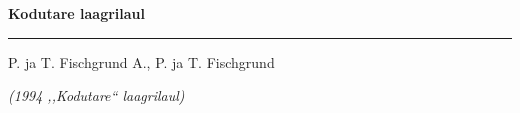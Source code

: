 \documentclass[12pt]{extbook}
\begin{document}
{
  \samepage
  \raggedbottom
  \raggedright
  \sloppy


  \vspace{0.2in}
    \centerline{
      \bfseries
      \large Kodutare laagrilaul
    }
  \nopagebreak[4]
  \vspace{0.1in}
  \nopagebreak[4]
  \hrule height 0.05ex
  \nopagebreak[4]
  \vspace{-0.05in}

  {\footnotesize P. ja T. Fischgrund \hfill A., P. ja T. Fischgrund }\\
  \vspace{0.01in}

  {\em {\footnotesize (1994 ,,Kodutare{``} laagrilaul) } }
  \vspace{0.01in}


}
\end{document}
